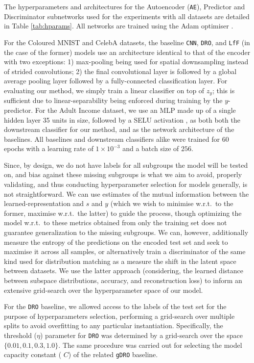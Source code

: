 The hyperparameters and architectures for the Autoencoder (\texttt{AE}), Predictor and Discriminator subnetworks used for the experiments with all datasets are detailed in Table \ref{tab:hparams}. All networks are trained using the Adam optimiser \citep{KinBa15}.

For the Coloured MNIST and CelebA datasets, the baseline \texttt{CNN}, \texttt{DRO}, and \texttt{LfF} (in the case of the former) models use an architecture identical to that of the encoder with two exceptions: 1) max-pooling being used for spatial downsampling instead of strided convolutions; 2) the final convolutional layer is followed by a global average pooling layer followed by a fully-connected classification layer. For evaluating our method, we simply train a linear classifier on top of $z_y$; this is sufficient due to linear-separability being enforced during training by the $y$-predictor.
For the Adult Income dataset, we use an MLP made up of a single hidden layer 35 units in size, followed by a SELU activation \citep{klambauer2017self}, as both both the downstream classifier for our method, and as the network architecture of the baselines. 
All baselines and downstream classifiers alike were trained for $60$ epochs with a learning rate of $1 \times 10^{-3}$ and a batch size of $256$.

Since, by design, we do not have labels for all subgroups the model will be tested on, and bias against these missing subgroups is what we aim to avoid, properly validating, and thus conducting hyperparameter selection for models generally, is not straightforward.
We can use estimates of the mutual information between the learned-representation and $s$ and $y$ (which we wish to minimise w.r.t.\ to the former, maximise w.r.t.\ the latter) to guide the process, though optimizing the model w.r.t.\ to these metrics obtained from only the training set does not guarantee generalization to the missing subgroups.
We can, however, additionally measure the entropy of the predictions on the encoded test set and seek to maximise it across all samples, or alternatively train a discriminator of the same kind used for distribution matching as a measure the shift in the latent space between datasets.
We use the latter approach (considering, the learned distance between subspace distributions, accuracy, and reconstruction loss) to inform an extensive grid-search over the hyperparameter space of our model.

For the \texttt{DRO} baseline, we allowed access to the labels of the test set for the purpose of hyperparameters selection, performing a grid-search over multiple splits to avoid overfitting to any particular instantiation.
Specifically, the threshold ($\eta$) parameter for \texttt{DRO} was determined by a grid-search over the space $\{0.01, 0.1, 0.3, 1.0\}$. The same procedure was carried out for selecting the model capacity constant ( $C$) of the related \texttt{gDRO} baseline.

